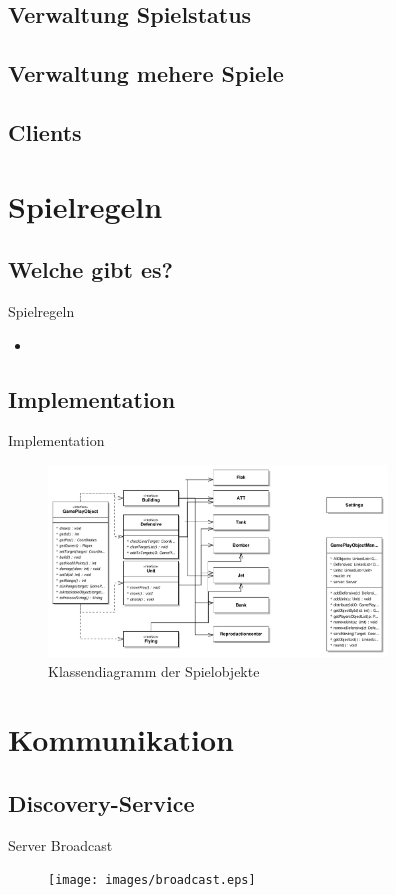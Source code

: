 \documentclass[12pt, utf8]{beamer}
\begin{document}
\subsection{Verwaltung Spielstatus}

\subsection{Verwaltung mehere Spiele}


\subsection{Clients}

\section{Spielregeln}
\subsection{Welche gibt es?}
\begin{frame}{Spielregeln}
\begin{itemize}
\item
\end{itemize}
\end{frame}


\subsection{Implementation}
\begin{frame}{Implementation}
\begin{figure}
\includegraphics[width=9cm]{images/GamePlayObjects.pdf}
\caption{Klassendiagramm der Spielobjekte}
\end{figure}
\end{frame}


\section{Kommunikation}
\begin{frame}
\subsection{Discovery-Service}

\begin{exampleblock}{Server Broadcast}

\end{exampleblock}
\begin{figure}
\texttt{[image: images/broadcast.eps]}
\end{figure}
\end{frame}
\end{document}
